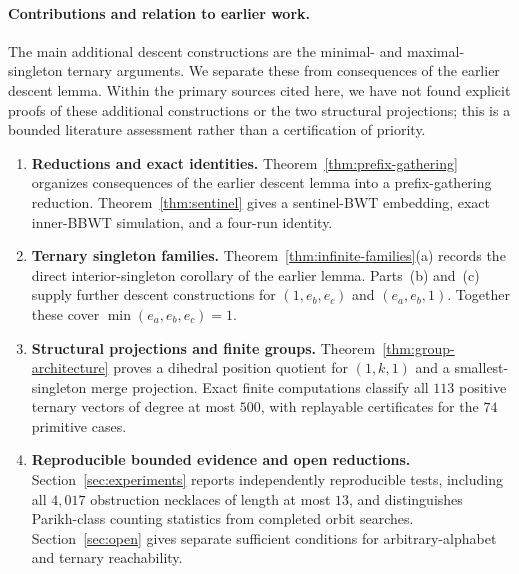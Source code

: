 \documentclass[11pt,a4paper]{article}
\theoremstyle{definition}
\begin{document}
\paragraph{Contributions and relation to earlier work.}
The main additional descent constructions are the minimal- and maximal-singleton ternary arguments. We separate these from consequences of the earlier descent lemma. Within the primary sources cited here, we have not found explicit proofs of these additional constructions or the two structural projections; this is a bounded literature assessment rather than a certification of priority.
\begin{enumerate}[leftmargin=*]
    \item \textbf{Reductions and exact identities.} Theorem~\ref{thm:prefix-gathering} organizes consequences of the earlier descent lemma into a prefix-gathering reduction. Theorem~\ref{thm:sentinel} gives a sentinel-BWT embedding, exact inner-BBWT simulation, and a four-run identity.
    \item \textbf{Ternary singleton families.} Theorem~\ref{thm:infinite-families}(a) records the direct interior-singleton corollary of the earlier lemma. Parts~(b) and~(c) supply further descent constructions for $(1,e_b,e_c)$ and $(e_a,e_b,1)$. Together these cover $\min(e_a,e_b,e_c)=1$.
    \item \textbf{Structural projections and finite groups.} Theorem~\ref{thm:group-architecture} proves a dihedral position quotient for $(1,k,1)$ and a smallest-singleton merge projection. Exact finite computations classify all $113$ positive ternary vectors of degree at most $500$, with replayable certificates for the $74$ primitive cases.
    \item \textbf{Reproducible bounded evidence and open reductions.} Section~\ref{sec:experiments} reports independently reproducible tests, including all $4{,}017$ obstruction necklaces of length at most $13$, and distinguishes Parikh-class counting statistics from completed orbit searches. Section~\ref{sec:open} gives separate sufficient conditions for arbitrary-alphabet and ternary reachability.
\end{enumerate}
\end{document}
